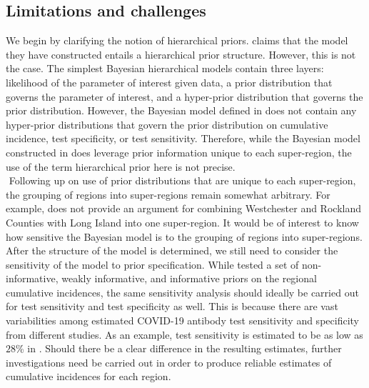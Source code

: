 \subsection{Limitations and challenges}
We begin by clarifying the notion of hierarchical priors. \cite{meyer2022adjusting} claims that the model they have constructed entails a hierarchical prior structure. However, this is not the case. The simplest Bayesian hierarchical models contain three layers: likelihood of the parameter of interest given data, a prior distribution that governs the parameter of interest, and a hyper-prior distribution that governs the prior distribution. However, the Bayesian model defined in \cite{meyer2022adjusting} does not contain any hyper-prior distributions that govern the prior distribution on cumulative incidence, test specificity, or test sensitivity. Therefore, while the Bayesian model constructed in \cite{meyer2022adjusting} does leverage prior information unique to each super-region, the use of the term hierarchical prior here is not precise.\\
\newline$ $
Following up on use of prior distributions that are unique to each super-region, the grouping of regions into super-regions remain somewhat arbitrary. For example, \cite{meyer2022adjusting} does not provide an argument for combining Westchester and Rockland Counties with Long Island into one super-region. It would be of interest to know how sensitive the Bayesian model is to the grouping of regions into super-regions. After the structure of the model is determined, we still need to consider the sensitivity of the model to prior specification. While \cite{meyer2022adjusting} tested a set of non-informative, weakly informative, and informative priors on the regional cumulative incidences, the same sensitivity analysis should ideally be carried out for test sensitivity and test specificity as well. This is because there are vast variabilities among estimated COVID-19 antibody test sensitivity and specificity from different studies. As an example, test sensitivity is estimated to be as low as $28$\% in \cite{noordin2022sero}. Should there be a clear difference in the resulting estimates, further investigations need be carried out in order to produce reliable estimates of cumulative incidences for each region.\\
\newline$ $
